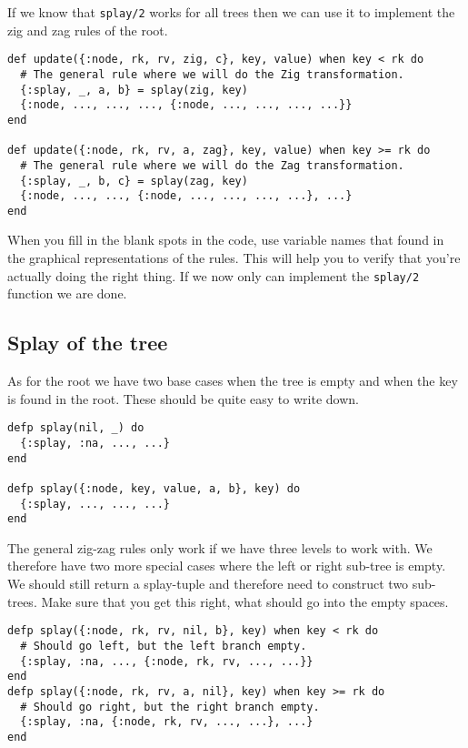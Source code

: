 \documentclass[a4paper,11pt]{article}
\begin{document}
If we know that {\tt splay/2} works for all trees then we can use it
to implement the zig and zag rules of the root.

\begin{verbatim}
def update({:node, rk, rv, zig, c}, key, value) when key < rk do
  # The general rule where we will do the Zig transformation.
  {:splay, _, a, b} = splay(zig, key)
  {:node, ..., ..., ..., {:node, ..., ..., ..., ...}}
end

def update({:node, rk, rv, a, zag}, key, value) when key >= rk do
  # The general rule where we will do the Zag transformation.
  {:splay, _, b, c} = splay(zag, key)
  {:node, ..., ..., {:node, ..., ..., ..., ...}, ...}
end
\end{verbatim}

When you fill in the blank spots in the code, use variable names that
found in the graphical representations of the rules. This will help
you to verify that you're actually doing the right thing. If we now
only can implement the {\tt splay/2} function we are done.

\subsection{Splay of the tree}
As for the root we have two base cases when the tree is empty and when the key
is found in the root. These should be quite easy to write down.

\begin{verbatim}
defp splay(nil, _) do
  {:splay, :na, ..., ...}
end

defp splay({:node, key, value, a, b}, key) do
  {:splay, ..., ..., ...}
end
\end{verbatim}

The general zig-zag rules only work if we have three levels to work
with. We therefore have two more special cases where the left or right
sub-tree is empty. We should still return a splay-tuple and therefore
need to construct two sub-trees. Make sure that you get this right,
what should go into the empty spaces.

\pagebreak

\begin{verbatim}
defp splay({:node, rk, rv, nil, b}, key) when key < rk do
  # Should go left, but the left branch empty.
  {:splay, :na, ..., {:node, rk, rv, ..., ...}}
end
defp splay({:node, rk, rv, a, nil}, key) when key >= rk do
  # Should go right, but the right branch empty.
  {:splay, :na, {:node, rk, rv, ..., ...}, ...}
end
\end{verbatim}
\end{document}
